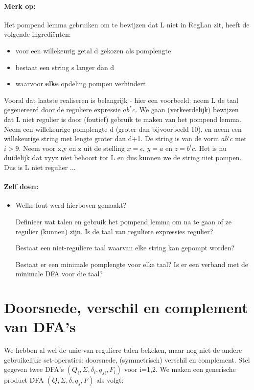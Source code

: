 \paragraph{Merk op:} Het pompend lemma gebruiken om te
bewijzen dat L niet in RegLan zit, heeft de volgende ingredi\"enten:
\begin{itemize}
\item voor een willekeurig getal d gekozen als pomplengte
\item bestaat een string s langer dan d
\item waarvoor {\bf elke} opdeling pompen verhindert
\end{itemize}

Vooral dat laatste realiseren is belangrijk - hier een voorbeeld:
neem L de taal gegenereerd door de reguliere expressie $ab^*c$.
We gaan (verkeerdelijk) bewijzen dat L niet regulier is door (foutief)
gebruik te maken van het pompend lemma. Neem een willekeurige
pomplengte d (groter dan bijvoorbeeld 10), en neem een willekeurige
string met lengte groter dan d+1. De string is van de vorm $ab^ic$ met
$i > 9$. Neem voor x,y en z uit de stelling $x = \epsilon$, $y = a$ en
$z = b^ic$. Het is nu duidelijk dat xyyz niet behoort tot L en dus
kunnen we de string niet pompen. Dus is L niet regulier ...

\paragraph{Zelf doen:}
\begin{itemize}
\item[]
Welke fout werd hierboven gemaakt?

Definieer wat talen en gebruik het pompend lemma om na te gaan of ze
regulier (kunnen) zijn. Is de taal van reguliere expressies regulier?

Bestaat een niet-reguliere taal waarvan elke string kan gepompt worden?

Bestaat er een minimale pomplengte voor elke taal? Is er een verband
met de minimale DFA voor die taal?
\end{itemize}

\clearpage

\section{Doorsnede, verschil en complement van DFA's}

We hebben al wel de unie van reguliere talen bekeken, maar nog niet de
andere gebruikelijke set-operaties: doorsnede, (symmetrisch) verschil
en complement. Stel gegeven twee DFA's
$(Q_i,\Sigma,\delta_i,q_{si},F_i)$ voor i=1,2. We maken een
generische product DFA $(Q,\Sigma,\delta,q_s,F)$ als volgt:

